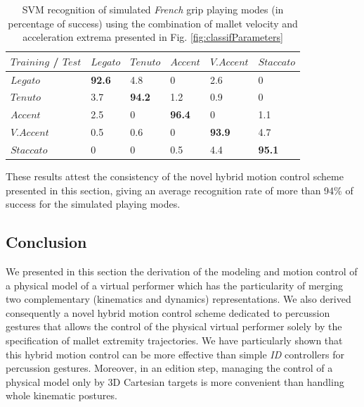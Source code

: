 \begin{table}%
	\centering
	\caption[SVM recognition of simulated \emph{French} grip playing modes]{SVM recognition of simulated \emph{French} grip playing modes (in percentage of success) using the combination of mallet velocity and acceleration extrema presented in Fig. \ref{fig:classifParameters}}
	\vspace{2mm}
	\begin{tabular}{||x{1.9cm}||x{1.9cm}|x{1.9cm}|x{1.9cm}|x{1.9cm}|x{1.9cm}||} \hline
		\small{$Training$ / $Test$} & \small{$Legato$} & \small{$Tenuto$} & \small{$Accent$} & \small{$V.Accent$} & \small{$Staccato$}		\tabularnewline \hline \hline
		\small{$Legato$} & 		\small{\textbf{92.6}} & \small{4.8} & \small{0} & \small{2.6} & \small{0} 	\tabularnewline \hline
		\small{$Tenuto$} & 		\small{3.7} & \small{\textbf{94.2}} & \small{1.2} & \small{0.9} & \small{0}	\tabularnewline \hline
		\small{$Accent$} & 		\small{2.5} & \small{0} & \small{\textbf{96.4}} & \small{0} & \small{1.1}	\tabularnewline \hline
		\small{$V.Accent$} & 	\small{0.5} & \small{0.6} &	\small{0} & \small{\textbf{93.9}} & \small{4.7}	\tabularnewline \hline
		\small{$Staccato$} & 	\small{0} & \small{0} & \small{0.5} & \small{4.4} & \small{\textbf{95.1}}	\tabularnewline \hline
	\end{tabular}
	\label{tab:recognitionFrenchVariationsSim}
\end{table}

These results attest the consistency of the novel hybrid motion control scheme presented in this section, giving an average recognition rate of more than 94{\%} of success for the simulated playing modes.


		\subsection{Conclusion}
		\label{subsec:Synthesis_Physics_Conclusion}

We presented in this section the derivation of the modeling and motion control of a physical model of a virtual performer which has the particularity of merging two complementary (kinematics and dynamics) representations. We also derived consequently a novel hybrid motion control scheme dedicated to percussion gestures that allows the control of the physical virtual performer solely by the specification of mallet extremity trajectories. We have particularly shown that this hybrid motion control can be more effective than simple \emph{ID} controllers for percussion gestures. Moreover, in an edition step, managing the control of a physical model only by 3D Cartesian targets is more convenient than handling whole kinematic postures.\\

